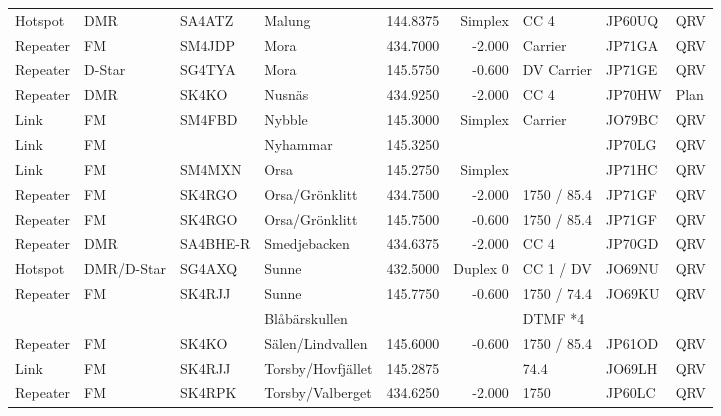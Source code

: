 \begin{longtable}{llllrrlll}
Hotspot  & DMR        & SA4ATZ   & Malung              & 144.8375     & Simplex    & CC 4          & JP60UQ      & QRV      \\
Repeater & FM         & SM4JDP   & Mora                & 434.7000     & -2.000     & Carrier       & JP71GA      & QRV      \\
Repeater & D-Star     & SG4TYA   & Mora                & 145.5750     & -0.600     & DV Carrier    & JP71GE      & QRV      \\
Repeater & DMR        & SK4KO    & Nusnäs              & 434.9250     & -2.000     & CC 4          & JP70HW      & Plan     \\
Link     & FM         & SM4FBD   & Nybble              & 145.3000     & Simplex    & Carrier       & JO79BC      & QRV      \\
Link     & FM         &          & Nyhammar            & 145.3250     &            &               & JP70LG      & QRV      \\
Link     & FM         & SM4MXN   & Orsa                & 145.2750     & Simplex    &               & JP71HC      & QRV      \\
Repeater & FM         & SK4RGO   & Orsa/Grönklitt      & 434.7500     & -2.000     & 1750 / 85.4   & JP71GF      & QRV      \\
Repeater & FM         & SK4RGO   & Orsa/Grönklitt      & 145.7500     & -0.600     & 1750 / 85.4   & JP71GF      & QRV      \\
Repeater & DMR        & SA4BHE-R & Smedjebacken        & 434.6375     & -2.000     & CC 4          & JP70GD      & QRV      \\
Hotspot  & DMR/D-Star & SG4AXQ   & Sunne               & 432.5000     & Duplex 0   & CC 1 / DV     & JO69NU      & QRV      \\
Repeater & FM         & SK4RJJ   & Sunne               & 145.7750     & -0.600     & 1750 / 74.4   & JO69KU      & QRV      \\
         &            &          & Blåbärskullen       &              &            & DTMF *4       &             &          \\
Repeater & FM         & SK4KO    & Sälen/Lindvallen    & 145.6000     & -0.600     & 1750 / 85.4   & JP61OD      & QRV      \\
Link     & FM         & SK4RJJ   & Torsby/Hovfjället   & 145.2875     &            & 74.4          & JO69LH      & QRV      \\
Repeater & FM         & SK4RPK   & Torsby/Valberget    & 434.6250     & -2.000     & 1750          & JP60LC      & QRV      \\

\end{longtable}
